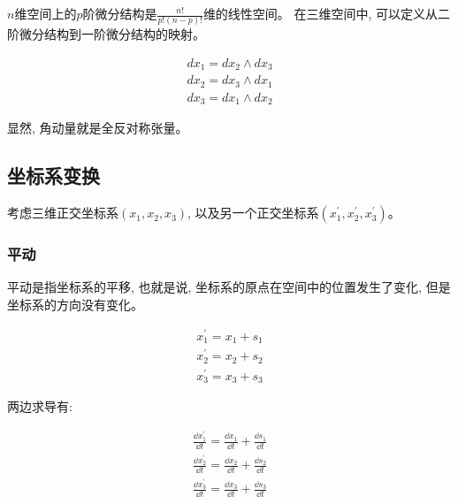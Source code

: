 \documentclass{ctexart}
\numberwithin{equation}{subsection}
\numberwithin{theorem}{subsection}
\numberwithin{definition}{subsection}
\numberwithin{proof}{subsection}
\numberwithin{lemma}{subsection}
\numberwithin{example}{subsection}
\numberwithin{remark}{subsection}
\numberwithin{corollary}{subsection}
\numberwithin{exercise}{subsection}
\numberwithin{problem}{subsection}
\numberwithin{question}{section}
\numberwithin{method}{subsection}
\begin{document}
    $n$维空间上的$p$阶微分结构是$\frac{n!}{p!(n-p)!}$维的线性空间。
    在三维空间中, 可以定义从二阶微分结构到一阶微分结构的映射。
    \footnotemark

    \begin{eqnarray}
        dx_1 = dx_2 \wedge dx_3 \\
        dx_2 = dx_3 \wedge dx_1 \\
        dx_3 = dx_1 \wedge dx_2
    \end{eqnarray}

    显然, 角动量就是全反对称张量。

    \subsection{坐标系变换}

    考虑三维正交坐标系$(x_1, x_2, x_3)$, 以及另一个正交坐标系$(x_1^\prime, x_2^\prime, x_3^\prime)$。

    \subsubsection{平动}

        平动是指坐标系的平移, 也就是说, 坐标系的原点在空间中的位置发生了变化, 但是坐标系的方向没有变化。

        \begin{equation}
            \begin{aligned}
                x_1^\prime = x_1 + s_1 \\
                x_2^\prime = x_2 + s_2 \\
                x_3^\prime = x_3 + s_3
            \end{aligned}
        \end{equation}

        两边求导有:

        \begin{equation}
            \begin{aligned}
                \frac{\dd x_1^\prime}{\dd t} = \frac{\dd x_1}{\dd t} + \frac{\dd s_1}{\dd t} \\
                \frac{\dd x_2^\prime}{\dd t} = \frac{\dd x_2}{\dd t} + \frac{\dd s_2}{\dd t} \\
                \frac{\dd x_3^\prime}{\dd t} = \frac{\dd x_3}{\dd t} + \frac{\dd s_3}{\dd t}
            \end{aligned}
        \end{equation}
\end{document}
